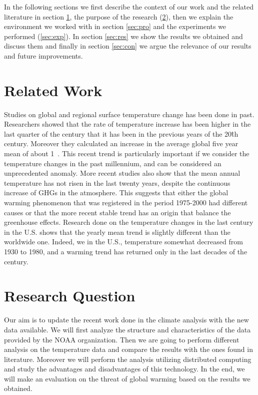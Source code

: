 \documentclass{vldb}
\begin{document}
In the following sections we first describe the context of our work and the related literature in section \ref{sec:rel}, the purpose of the research (\ref{sec:question}), then we explain the environment we worked with in section \ref{sec:pro} and the experiments we performed (\ref{sec:exp}). In section \ref{sec:res} we show the results we obtained and discuss them and finally in section \ref{sec:con} we argue the relevance of our results and future improvements.


\section{Related Work}
\label{sec:rel}
Studies on global and regional surface temperature change has been done in past. Researchers showed that the rate of temperature increase has been higher in the last quarter of the century that it has been in the previous years of the 20\^{th} century. Moreover they calculated an increase in the average global five year mean of about 1\celsius~\cite{hansen1999giss}. This recent trend is particularly important if we consider the temperature changes in the past millennium, and can be considered an unprecedented anomaly\cite{mann1999northern}. More recent studies also show that the mean annual temperature has not risen in the last twenty years, despite the continuous increase of GHGs in the atmosphere\cite{kosaka2013recent}. This suggests that either the global warming phenomenon that was registered in the period 1975-2000 had different causes or that the more recent stable trend has an origin that balance the greenhouse effects.
Research done on the temperature changes in the last century in the U.S. shows that the yearly mean trend is slightly different than the worldwide one. Indeed, we in the U.S., temperature somewhat decreased from 1930 to 1980, and a warming trend has returned only in the last decades of the century\cite{hansen1999giss}.  

\section{Research Question}
\label{sec:question}
Our aim is to update the recent work done in the climate analysis with the new data available. We will first analyze the structure and characteristics of the data provided by the NOAA organization. Then we are going to perform different analysis on the temperature data and compare the results with the ones found in literature.  Moreover we will perform the analysis utilizing distributed computing and study the advantages and disadvantages of this technology. In the end, we will make an evaluation on the threat of global warming based on the results we obtained. \\
\end{document}

